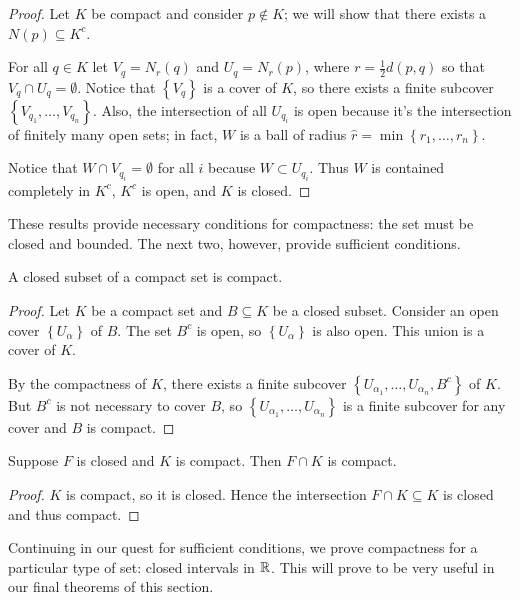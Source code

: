 \documentclass[../m131main.tex]{subfiles}
\begin{document}
\begin{proof}
    Let $K$ be compact and consider $p \not\in K$; we will show that there exists a $N(p) \subseteq K^c$.

    For all $q \in K$ let $V_q = N_r(q)$ and $U_q = N_r(p)$, where $r = \frac{1}{2} d(p,q)$ so that $V_q \cap U_q = \emptyset$.
    Notice that $\left\{ V_q \right\}$ is a cover of $K$, so there exists a finite subcover $\left\{ V_{q_1} , \ldots, V_{q_n}\right\}$.
    Also, the intersection of all $U_{q_i}$ is open because it's the intersection of finitely many open sets; in fact, $W$ is a ball of radius $\hat r = \min \left\{ r_1, \ldots, r_n \right\}$.

    Notice that $W \cap V_{q_i} = \emptyset$ for all $i$ because $W \subset U_{q_i}$.
    Thus $W$ is contained completely in $K^c$, $K^c$ is open, and $K$ is closed.
\end{proof}

These results provide necessary conditions for compactness: the set must be closed and bounded.
The next two, however, provide sufficient conditions.

\begin{theorem}[]
    A closed subset of a compact set is compact.
\end{theorem}

\begin{proof}
    Let $K$ be a compact set and $B \subseteq K$ be a closed subset.
    Consider an open cover $\left\{ U_\alpha \right\}$ of $B$.
    The set $B^c$ is open, so $\left\{ U_\alpha \right\}$ is also open.
    This union is a cover of $K$.

    By the compactness of $K$, there exists a finite subcover $\left\{ U_{\alpha_1}, \ldots, U_{\alpha_n}, B^c \right\}$ of $K$.
    But $B^c$ is not necessary to cover $B$, so $\left\{ U_{\alpha_1}, \ldots, U_{\alpha_n} \right\}$ is a finite subcover for any cover and $B$ is compact.
\end{proof}

\begin{corollary}[]
    Suppose $F$ is closed and $K$ is compact.
    Then $F \cap K$ is compact.
\end{corollary}

\begin{proof}
    $K$ is compact, so it is closed.
    Hence the intersection $F \cap K \subseteq K$ is closed and thus compact.
\end{proof}

Continuing in our quest for sufficient conditions, we prove compactness for a particular type of set: closed intervals in $\mathbb{R}$.
This will prove to be very useful in our final theorems of this section.
\end{document}
